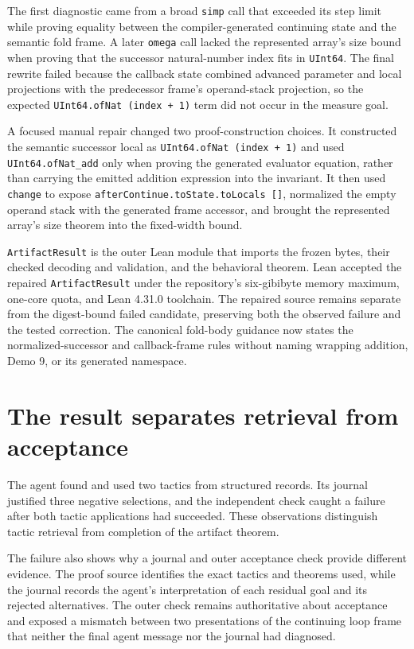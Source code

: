 \documentclass[10pt]{article}
\newcommand{\code}[1]{\texttt{#1}}
\begin{document}
The first diagnostic came from a broad \code{simp} call that exceeded its step limit while proving equality between the compiler-generated continuing state and the semantic fold frame.  A later \code{omega} call lacked the represented array's size bound when proving that the successor natural-number index fits in \code{UInt64}.  The final rewrite failed because the callback state combined advanced parameter and local projections with the predecessor frame's operand-stack projection, so the expected \code{UInt64.ofNat (index + 1)} term did not occur in the measure goal.

A focused manual repair changed two proof-construction choices.  It constructed the semantic successor local as \code{UInt64.ofNat (index + 1)} and used \code{UInt64.ofNat\_add} only when proving the generated evaluator equation, rather than carrying the emitted addition expression into the invariant.  It then used \code{change} to expose \code{afterContinue.toState.toLocals []}, normalized the empty operand stack with the generated frame accessor, and brought the represented array's size theorem into the fixed-width bound.

\code{ArtifactResult} is the outer Lean module that imports the frozen bytes, their checked decoding and validation, and the behavioral theorem.  Lean accepted the repaired \code{ArtifactResult} under the repository's six-gibibyte memory maximum, one-core quota, and Lean 4.31.0 toolchain.  The repaired source remains separate from the digest-bound failed candidate, preserving both the observed failure and the tested correction.  The canonical fold-body guidance now states the normalized-successor and callback-frame rules without naming wrapping addition, Demo 9, or its generated namespace.

\section{The result separates retrieval from acceptance}

The agent found and used two tactics from structured records.  Its journal justified three negative selections, and the independent check caught a failure after both tactic applications had succeeded.  These observations distinguish tactic retrieval from completion of the artifact theorem.

The failure also shows why a journal and outer acceptance check provide different evidence.  The proof source identifies the exact tactics and theorems used, while the journal records the agent's interpretation of each residual goal and its rejected alternatives.  The outer check remains authoritative about acceptance and exposed a mismatch between two presentations of the continuing loop frame that neither the final agent message nor the journal had diagnosed.
\end{document}
